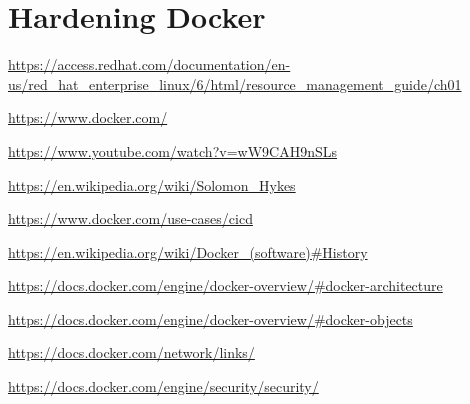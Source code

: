 \documentclass[a4paper,12pt]{article}
\begin{document}
\newpage

\section{Hardening Docker}

\newpage

\begin{thebibliography}{99}

 
\url{https://access.redhat.com/documentation/en-us/red_hat_enterprise_linux/6/html/resource_management_guide/ch01}

\url{https://www.docker.com/}

\url{https://www.youtube.com/watch?v=wW9CAH9nSLs}

\url{https://en.wikipedia.org/wiki/Solomon_Hykes}

\url{https://www.docker.com/use-cases/cicd}

\url{https://en.wikipedia.org/wiki/Docker_(software)#History}

\url{https://docs.docker.com/engine/docker-overview/#docker-architecture}

\url{https://docs.docker.com/engine/docker-overview/#docker-objects}

\url{https://docs.docker.com/network/links/}

\url{https://docs.docker.com/engine/security/security/}

\end{thebibliography}
\end{document}
